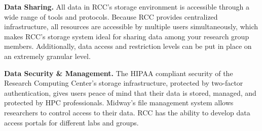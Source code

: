  \textbf{Data Sharing.} All data in RCC's storage environment is accessible through a wide range of tools and protocols. Because RCC provides centralized infrastructure, all resources are accessible by multiple users simultaneously, which makes RCC’s storage system ideal for sharing data among your research group members. Additionally, data access and restriction levels can be put in place on an extremely granular level.

\textbf{Data Security \& Management.} The HIPAA compliant security of the Research Computing Center’s storage infrastructure, protected by two-factor authentication,  gives users peace of mind that their data is stored, managed, and protected by HPC professionals. Midway's file management system allows researchers to control access to their data. RCC has the ability to develop data access portals for different labs and groups.






